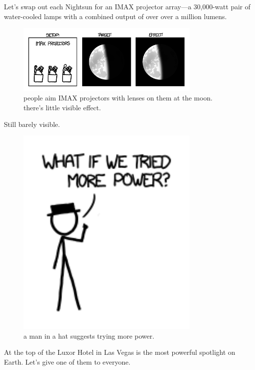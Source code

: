 {Let’s swap out each Nightsun for an IMAX projector array—a 30,000-watt pair of water-cooled lamps with a combined output of over over a million lumens.}

\begin{figure}[!htbp]
\centering
\includegraphics[scale=0.5, max width=0.8\textwidth]{imgs/a/13/laser_pointer_imax.png}
\caption{people aim IMAX projectors with lenses on them at the moon. there's little visible effect.}
\end{figure}

{Still barely visible.}

\begin{figure}[!htbp]
\centering
\includegraphics[scale=0.5, max width=0.8\textwidth]{imgs/a/13/laser_pointer_more_power.png}
\caption{a man in a hat suggests trying more power.}
\end{figure}

{At the top of the Luxor Hotel in Las Vegas is the most powerful spotlight on Earth. Let’s give one of them to everyone.}

